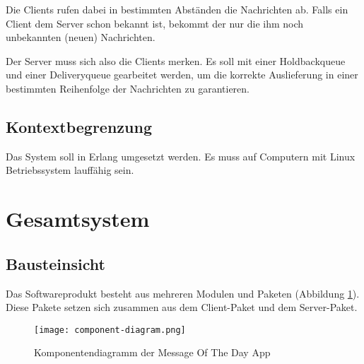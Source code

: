 \documentclass{article}
\begin{document}
Die Clients rufen dabei in bestimmten Abständen die Nachrichten ab. Falls ein Client dem Server schon bekannt ist, bekommt der nur die ihm noch unbekannten (neuen) Nachrichten.

Der Server muss sich also die Clients merken. Es soll mit einer Holdbackqueue und einer Deliveryqueue gearbeitet werden, um die korrekte Auslieferung in einer bestimmten Reihenfolge der Nachrichten zu garantieren.

\subsection{Kontextbegrenzung}
Das System soll in Erlang umgesetzt werden. Es muss auf Computern mit Linux Betriebssystem lauffähig sein.

\newpage

\section{Gesamtsystem}

\subsection{Bausteinsicht}
Das Softwareprodukt besteht aus mehreren Modulen und Paketen (Abbildung \ref{fig:component-diagram}). Diese Pakete setzen sich zusammen aus dem Client-Paket und dem Server-Paket.

\begin{figure}[H]
    \centering
    \texttt{[image: component-diagram.png]}
    \caption[seq-dia]{Komponentendiagramm der Message Of The Day App}
    \label{fig:component-diagram}
\end{figure}
\end{document}
